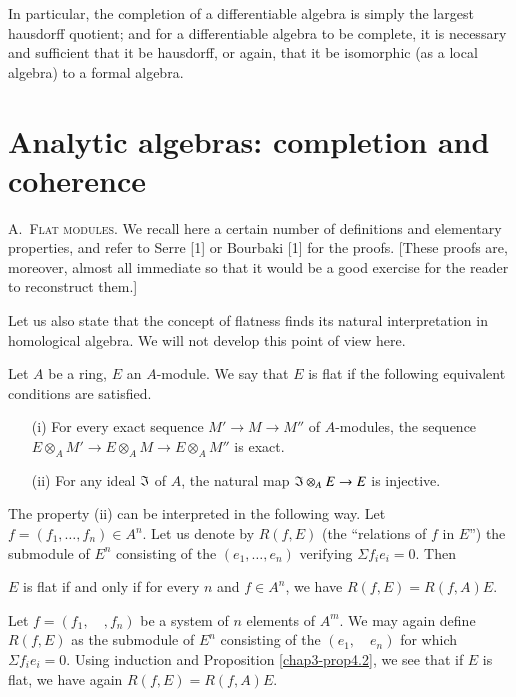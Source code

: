 In particular, the completion of a differentiable algebra is simply the largest hausdorff quotient; and for a differentiable algebra to be complete, it is necessary and sufficient that it be hausdorff, or again, that it be isomorphic (as a local algebra) to a formal algebra.

\section{Analytic algebras: completion and coherence}\label{chap3-sec4}

A.~\textsc{Flat modules.} We recall here a certain number of definitions and elementary properties, and refer to Serre [1] or Bourbaki [1] for the proofs. [These proofs are, moreover, almost all immediate so that it would be a good exercise for the reader to reconstruct them.]

Let us also state that the concept of flatness finds its natural interpretation in homological algebra. We will not develop this point of view here.

\begin{definition}\label{chap3-defi4.1}
Let $A$ be a ring, $E$ an $A$-module. We say that $E$ is flat if the following equivalent conditions are satisfied.
\begin{itemize}
\item[\rm(i)] For every exact sequence $M'\to M\to M''$ of $A$-modules, the sequence $E\otimes_{A}M'\to E\otimes_{A}M\to E\otimes_{A}M''$ is exact.

\item[\rm(ii)] For any ideal $\mathfrak{I}$ of $A$, the natural map $\mathfrak{I}\otimes_{A}E\to E$ is injective.
\end{itemize}
\end{definition}

The property (ii) can be interpreted in the following way. Let $f=(f_{1},\ldots,f_{n})\in A^{n}$. Let us denote by $R(f,E)$ (the ``relations of $f$ in $E$'') the submodule of $E^{n}$ consisting of the $(e_{1},\ldots,e_{n})$ verifying $\Sigma f_{i}e_{i}=0$. Then

\begin{proposition}\label{chap3-prop4.2}
$E$ is flat if and only if for every $n$ and $f\in A^{n}$, we have $R(f,E)=R(f,A)E$.
\end{proposition}

\begin{remark}\label{chap3-rem4.3}
Let $f=(f_{1},\quad,f_{n})$ be a system of $n$ elements of $A^{m}$. We may again define $R(f,E)$ as the submodule of $E^{n}$ consisting of the $(e_{1},\quad e_{n})$ for which $\Sigma f_{i}e_{i}=0$. Using induction and Proposition \ref{chap3-prop4.2}, we see that if $E$ is flat, we have again $R(f,E)=R(f,A)E$.
\end{remark}

